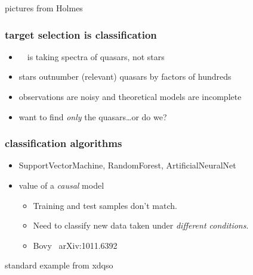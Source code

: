 \documentclass[pdftex]{beamer}
\begin{document}
\begin{frame}
pictures from Holmes
\end{frame}

\begin{frame}
  \frametitle{target selection is classification}
  \begin{itemize}
  \item \sdssiii\ \boss\ is taking spectra of quasars, not stars
  \item stars outnumber (relevant) quasars by factors of hundreds
  \item observations are noisy and theoretical models are incomplete
  \item want to find \emph{only} the quasars\ldots or do we?
  \end{itemize}
\end{frame}

\begin{frame}
  \frametitle{classification algorithms}
  \begin{itemize}
  \item SupportVectorMachine, RandomForest, ArtificialNeuralNet
  \item value of a \emph{causal} model
    \begin{itemize}
    \item Training and test samples don't match.
    \item Need to classify new data taken under \emph{different conditions}.
    \item Bovy \etal\ arXiv:1011.6392
    \end{itemize}
  \end{itemize}
\end{frame}


\begin{frame}
standard example from xdqso
\end{frame}
\end{document}
